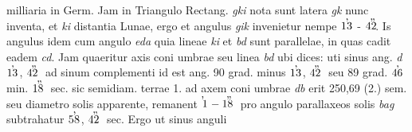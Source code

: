 milliaria in Germ.  Jam in Triangulo Rectang. \textit{gki} nota  sunt latera \textit{gk} nunc inventa, et \textit{ki} distantia Lunae\protect{}, ergo  et angulus \textit{gik}  invenietur  nempe $13\hspace{-6pt}\raisebox{9pt}{,}\protect\hspace{4pt}$ - $42\hspace{-6pt}\raisebox{9pt}{,,}$.  Is angulus idem cum  angulo \textit{eda} quia  lineae \textit{ki} et \textit{bd} sunt parallelae, in quas cadit eadem \textit{cd}.  Jam quaeritur axis coni umbrae seu linea \textit{bd} ubi dices: uti sinus  ang. \textit{d} $13\hspace{-6pt}\raisebox{9pt}{,}\protect\hspace{4pt}$, $42\hspace{-6pt}\raisebox{9pt}{,,}\protect\hspace{4pt}$ ad sinum complementi id est ang. 90 grad. minus $13\hspace{-6pt}\raisebox{9pt}{,}\protect\hspace{4pt}$, $42\hspace{-6pt}\raisebox{9pt}{,,}\protect\hspace{4pt}$  seu 89 grad. $46\hspace{-6pt}\raisebox{9pt}{,}\protect\hspace{4pt}$ min. $18\hspace{-6pt}\raisebox{9pt}{,,}\protect\hspace{4pt}$ sec. sic semidiam. terrae\protect{} 1. ad axem coni  umbrae \textit{db} erit 250,69 (2.) sem.  seu diametro solis\protect{} apparente,  remanent $1\hspace{-6pt}\raisebox{9pt}{,}\protect\hspace{4pt}-18\hspace{-6pt}\raisebox{9pt}{,,}\protect\hspace{4pt}$ pro angulo parallaxeos\protect{} solis\protect{} \textit{bag} subtrahatur  $58\hspace{-6pt}\raisebox{9pt}{,}\protect\hspace{4pt}$, $42\hspace{-6pt}\raisebox{9pt}{,,}\protect\hspace{4pt}$ sec. Ergo ut sinus anguli 